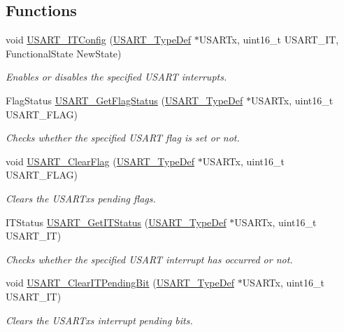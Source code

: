 \subsection*{Functions}
\begin{DoxyCompactItemize}
\item 
void \hyperlink{group___u_s_a_r_t___group9_ga6d8f2dd1f34060ae7e386e3e5d56b6f6}{U\+S\+A\+R\+T\+\_\+\+I\+T\+Config} (\hyperlink{struct_u_s_a_r_t___type_def}{U\+S\+A\+R\+T\+\_\+\+Type\+Def} $\ast$U\+S\+A\+R\+Tx, uint16\+\_\+t U\+S\+A\+R\+T\+\_\+\+IT, Functional\+State New\+State)
\begin{DoxyCompactList}\small\item\em Enables or disables the specified U\+S\+A\+RT interrupts. \end{DoxyCompactList}\item 
Flag\+Status \hyperlink{group___u_s_a_r_t___group9_ga144630722defc9e312f0ad280b68e9da}{U\+S\+A\+R\+T\+\_\+\+Get\+Flag\+Status} (\hyperlink{struct_u_s_a_r_t___type_def}{U\+S\+A\+R\+T\+\_\+\+Type\+Def} $\ast$U\+S\+A\+R\+Tx, uint16\+\_\+t U\+S\+A\+R\+T\+\_\+\+F\+L\+AG)
\begin{DoxyCompactList}\small\item\em Checks whether the specified U\+S\+A\+RT flag is set or not. \end{DoxyCompactList}\item 
void \hyperlink{group___u_s_a_r_t___group9_gad962e148fc466ae1b45b288f6c91d966}{U\+S\+A\+R\+T\+\_\+\+Clear\+Flag} (\hyperlink{struct_u_s_a_r_t___type_def}{U\+S\+A\+R\+T\+\_\+\+Type\+Def} $\ast$U\+S\+A\+R\+Tx, uint16\+\_\+t U\+S\+A\+R\+T\+\_\+\+F\+L\+AG)
\begin{DoxyCompactList}\small\item\em Clears the U\+S\+A\+R\+Tx\textquotesingle{}s pending flags. \end{DoxyCompactList}\item 
I\+T\+Status \hyperlink{group___u_s_a_r_t___group9_ga93d8f031241bcdbe938d091a85295445}{U\+S\+A\+R\+T\+\_\+\+Get\+I\+T\+Status} (\hyperlink{struct_u_s_a_r_t___type_def}{U\+S\+A\+R\+T\+\_\+\+Type\+Def} $\ast$U\+S\+A\+R\+Tx, uint16\+\_\+t U\+S\+A\+R\+T\+\_\+\+IT)
\begin{DoxyCompactList}\small\item\em Checks whether the specified U\+S\+A\+RT interrupt has occurred or not. \end{DoxyCompactList}\item 
void \hyperlink{group___u_s_a_r_t___group9_ga1fc25d0338695063be5e50156955d9bc}{U\+S\+A\+R\+T\+\_\+\+Clear\+I\+T\+Pending\+Bit} (\hyperlink{struct_u_s_a_r_t___type_def}{U\+S\+A\+R\+T\+\_\+\+Type\+Def} $\ast$U\+S\+A\+R\+Tx, uint16\+\_\+t U\+S\+A\+R\+T\+\_\+\+IT)
\begin{DoxyCompactList}\small\item\em Clears the U\+S\+A\+R\+Tx\textquotesingle{}s interrupt pending bits. \end{DoxyCompactList}\end{DoxyCompactItemize}


